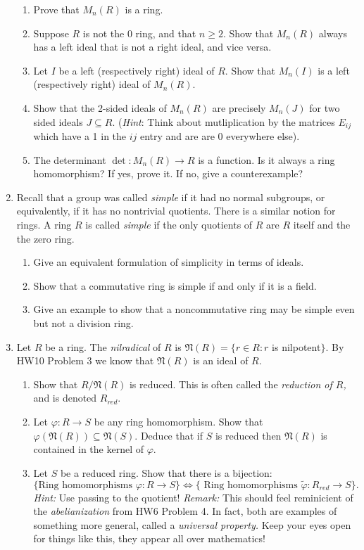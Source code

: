 \documentclass[11pt]{article}
\newcommand{\fN}{\mathfrak{N}}
\begin{document}
\begin{enumerate}
{  \begin{enumerate}
    \item{
    Prove that $M_n(R)$ is a ring.
    }
    \item{
    Suppose $R$ is not the 0 ring, and that $n\ge2$.  Show that $M_n(R)$ always has a left ideal that is not a right ideal, and vice versa.
    }
    \item{
    Let $I$ be a left (respectively right) ideal of $R$.  Show that $M_n(I)$ is a left (respectively right) ideal of $M_n(R)$.
    }
    \item{
    Show that the 2-sided ideals of $M_n(R)$ are precisely $M_n(J)$ for two sided ideals $J\subseteq R$.  (\textit{Hint}: Think about mutliplication by the matrices $E_{ij}$ which have a 1 in the $ij$ entry and are are 0 everywhere else).
    }
    \item{
    The determinant $\det:M_n(R)\to R$ is a function.  Is it always a ring homomorphism?  If yes, prove it.  If no, give a counterexample?
    }
  \end{enumerate}
  }
  \item{
  Recall that a group was called \textit{simple} if it had no normal subgroups, or equivalently, if it has no nontrivial quotients.  There is a similar notion for rings.  A ring $R$ is called \textit{simple} if the only quotients of $R$ are $R$ itself and the the zero ring.
  \begin{enumerate}
    \item{Give an equivalent formulation of simplicity in terms of ideals.}
    \item{Show that a commutative ring is simple if and only if it is a field.}
    \item{Give an example to show that a noncommutative ring may be simple even but not a division ring.}
  \end{enumerate}
  }
  \item{
  Let $R$ be a ring.  The \textit{nilradical} of $R$ is $\fN(R)=\{r\in R:r$ is nilpotent$\}$.  By HW10 Problem 3 we know that $\fN(R)$ is an ideal of $R$.
  \begin{enumerate}
    \item{Show that $R/\fN(R)$ is reduced.  This is often called the \textit{reduction of $R$,} and is denoted $R_{red}$.}
    \item{Let $\varphi:R\to S$ be any ring homomorphism.  Show that $\varphi(\fN(R))\subseteq\fN(S)$.  Deduce that if $S$ is reduced then $\fN(R)$ is contained in the kernel of $\varphi$.}
    \item{Let $S$ be a reduced ring.  Show that there is a bijection:
    \[\{\text{Ring homomorphisms }\varphi:R\to S\}\Longleftrightarrow\{\text{ Ring homomorphisms }\tilde\varphi:R_{red}\to S\}.\]
    \textit{Hint:} Use passing to the quotient!  \textit{Remark: }This should feel reminicient of the \textit{abelianization} from HW6 Problem 4.  In fact, both are examples of something more general, called a \textit{universal property.}  Keep your eyes open for things like this, they appear all over mathematics!}
  \end{enumerate}
  }
\end{enumerate}
\end{document}
